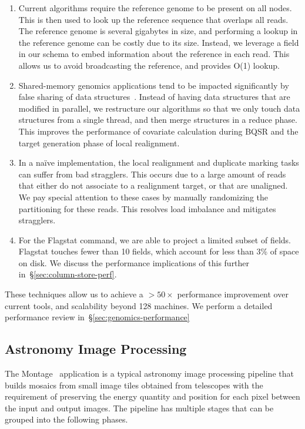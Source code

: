 \documentclass{acm_proc_article-sp}
\begin{document}
\begin{enumerate}
\item Current algorithms require the reference genome to be present on all nodes. This is then used to
look up the reference sequence that overlaps all reads. The reference genome is several gigabytes in
size, and performing a lookup in the reference genome can be costly due to its size. Instead, we leverage
a field in our schema to embed information about the reference in each read. This allows us to avoid
broadcasting the reference, and provides O(1) lookup.
\item Shared-memory genomics applications tend to be impacted significantly by false sharing of data
\linebreak structures~\cite{zaharia11}. Instead of having data structures that are modified in parallel, we
restructure our algorithms so that we only touch data structures from a single thread, and then merge
structures in a reduce phase. This improves the performance of covariate calculation during BQSR and
the target generation phase of local realignment.
\item In a na\"{i}ve implementation, the local realignment and duplicate marking tasks can suffer from bad
stragglers. This occurs due to a large amount of reads that either do not associate to a realignment
target, or that are unaligned. We pay special attention to these cases by manually randomizing the
partitioning for these reads. This resolves load imbalance and mitigates stragglers.
\item For the Flagstat command, we are able to project a limited subset of fields. Flagstat touches fewer
than 10 fields, which account for less than 3\% of space on disk. We discuss the performance
implications of this further in~\S\ref{sec:column-store-perf}.
\end{enumerate}

These techniques allow us to achieve a $>50\times$ performance improvement over current tools, and
scalability beyond 128 machines. We perform a detailed performance review
in~\S\ref{sec:genomics-performance}

\subsection{Astronomy Image Processing}
\label{sec:astronomy-image-processing}
The Montage~\cite{montage} application is a typical astronomy image processing pipeline that builds
mosaics from small image tiles obtained from telescopes with the requirement of preserving the energy
quantity and position for each pixel between the input and output images. The pipeline has multiple
stages that can be grouped into the following phases.
\end{document}
